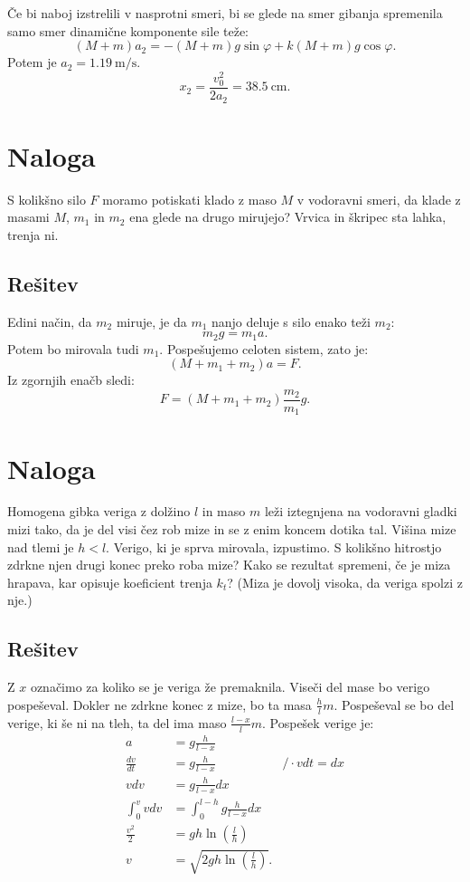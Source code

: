 \documentclass[a4,11pt]{article}
\begin{document}
    Če bi naboj izstrelili v nasprotni smeri, bi se glede na smer gibanja spremenila samo smer dinamične komponente sile teže:
    \[(M + m) a_2 = - (M + m)g\sin\varphi + k(M + m)g\cos\varphi.\]
    Potem je \(a_2 = \qty{1.19}{\m\per\s}\).
    \[x_2 = \frac{v_0^2}{2a_2} = \qty{38.5}{\cm}.\]

\section{Naloga}
    S kolikšno silo \(F\) moramo potiskati klado z maso \(M\) v vodoravni smeri, da klade z masami
    \(M\), \(m_1\) in \(m_2\) ena glede na drugo mirujejo? Vrvica in škripec sta lahka, trenja ni.

\subsection*{Rešitev}
    Edini način, da \(m_2\) miruje, je da \(m_1\) nanjo deluje s silo enako teži \(m_2\):
    \[m_2 g = m_1 a.\]
    Potem bo mirovala tudi \(m_1\). Pospešujemo celoten sistem, zato je:
    \[(M + m_1 + m_2) a = F.\]
    Iz zgornjih enačb sledi:
    \[F = (M + m_1 + m_2) \frac{m_2}{m_1} g.\]

\section{Naloga}
    Homogena gibka veriga z dolžino \(l\) in maso \(m\) leži iztegnjena na vodoravni gladki mizi tako,
    da je del visi čez rob mize in se z enim koncem dotika tal. Višina mize nad tlemi je \(h < l\).
    Verigo, ki je sprva mirovala, izpustimo. S kolikšno hitrostjo zdrkne njen drugi konec preko
    roba mize? Kako se rezultat spremeni, če je miza hrapava, kar opisuje koeficient trenja \(k_t\)?
    (Miza je dovolj visoka, da veriga spolzi z nje.)

\subsection*{Rešitev}
    Z \(x\) označimo za koliko se je veriga že premaknila.
    Viseči del mase bo verigo pospeševal. Dokler ne zdrkne konec z mize, bo ta masa \(\frac{h}{l}m\).
    Pospeševal se bo del verige, ki še ni na tleh, ta del ima maso \(\frac{l - x}{l}m\).
    Pospešek verige je:
    \begin{align*}
        a &= g\frac{h}{l - x} & \\
        \frac{dv}{dt} &= g\frac{h}{l - x} & \big/ \cdot v dt = dx\\
        v dv &= g\frac{h}{l - x} dx & \\
        \int_0^v v dv &= \int_0^{l - h} g\frac{h}{l - x} dx & \\
        \frac{v^2}{2} &= g h \ln\left(\frac{l}{h}\right) & \\
        v &= \sqrt{2 g h \ln\left(\frac{l}{h}\right)}. &
    \end{align*}
\end{document}
